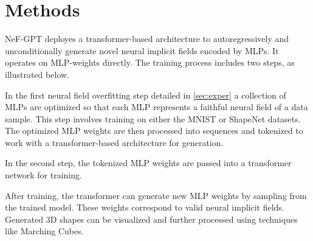 \section{Methods}

NeF-GPT deployes a transformer-based architecture to autoregressively and unconditionally generate novel neural implicit fields encoded by MLPs. It operates on MLP-weights directly. The training process includes two steps, as illustrated below.

In the first neural field overfitting step detailed in \ref{sec:exper} a collection of MLPs are optimized so that each MLP represents a faithful neural field of a data sample. This step involves training on either the MNIST or ShapeNet datasets. The optimized MLP weights are then processed into sequences and tokenized to work with a transformer-based architecture for generation.

In the second step, the tokenized MLP weights are passed into a transformer network for training.

After training, the transformer can generate new MLP weights by sampling from the trained model. These weights correspond to valid neural implicit fields. Generated 3D shapes can be visualized and further processed using techniques like Marching Cubes.